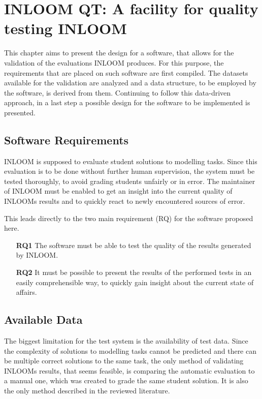 \chapter{INLOOM QT: A facility for quality testing INLOOM}

This chapter aims to present the design for a software, that allows for the validation
of the evaluations INLOOM \cite{1} produces. For this purpose, the requirements that are placed
on such software are first compiled. The datasets available for the validation are 
analyzed and a data structure, to be employed by the software, is derived from them.
Continuing to follow this data-driven approach, in a last step a possible design for the
software to be implemented is presented.

\section{Software Requirements}
INLOOM is supposed to evaluate student solutions to modelling tasks. Since this evaluation
is to be done without further human supervision, the system must be tested thoroughly, to 
avoid grading students unfairly or in error. The maintainer of INLOOM must be enabled to get
an insight into the current quality of INLOOMs results and to quickly react to newly encountered
sources of error.

This leads directly to the two main requirement (RQ) for the software proposed here. 

\begin{itemize}
    \item[\textbf{RQ1}] The software must be able to test the quality of the results generated
    by INLOOM.
    \item[\textbf{RQ2}] It must be possible to present the results of the performed tests
    in an easily comprehensible way, to quickly gain insight about the current state of affairs.
\end{itemize}

\section{Available Data}
The biggest limitation for the test system is the availability of test data. Since the
complexity of solutions to modelling tasks cannot be predicted and there can be multiple 
correct solutions to the same task, the only method of validating INLOOMs results, that seems 
feasible, is comparing the automatic evaluation to a manual one, which was created to grade the 
same student solution.  It is also the only method described in the reviewed literature.

